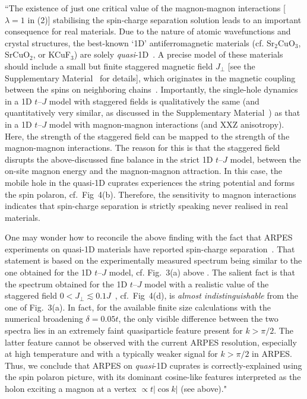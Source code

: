 \documentclass[%
 manuscript,
 amsmath,amssymb,
 aps, onecolumn,
prl,
]{revtex4-1}
\begin{document}
``The existence of just one critical value of the magnon-magnon interactions [$\lambda =1$ in (2)] stabilising the spin-charge separation solution leads to an important consequence for real materials. Due to the nature of atomic wavefunctions and crystal structures, the best-known `1D'
antiferromagnetic materials (cf. Sr$_2$CuO$_3$, SrCuO$_2$, or KCuF$_3$) are solely {\it quasi}-1D~\cite{Kojima1997, Matsuda1997, Lake2005}. A precise model of these materials should include a small but finite staggered magnetic field $J_\perp$ [see the Supplementary Material~\cite{SM} for details], which originates in the magnetic coupling between the spins on neighboring chains~\cite{Schulz1996, Essler1997, Sandvik1999}.
Importantly, the single-hole dynamics in a 1D $t$--$J$ model with staggered fields is qualitatively the same (and quantitatively very similar, as discussed in the Supplementary Material~\cite{SM}) as
that in a 1D $t$--$J$ model with magnon-magnon interactions (and XXZ anisotropy). Here, the strength of the staggered field can be mapped to the strength of the magnon-magnon interactions.
The reason for this is that the staggered field disrupts the above-discussed fine balance in the strict 1D $t$--$J$ model, between the on-site magnon energy and the magnon-magnon attraction. 
In this case, the mobile hole in the quasi-1D cuprates experiences the string potential and forms 
the spin polaron, cf.~Fig~4(b). Therefore, the sensitivity to magnon interactions indicates that spin-charge separation is strictly speaking never realised in real materials.

One may wonder how to reconcile the above finding with the fact that ARPES experiments on quasi-1D materials have reported 
spin-charge separation~\cite{Kim96, Kim1997, Fujisawa1999, Koitzsch2006, Kim06}. That statement is based on the experimentally measured spectrum being similar 
to the one obtained for the 1D $t$--$J$ model, 
cf. Fig.~3(a) above \cite{Kim96, Kim1997, Fujisawa1999, Koitzsch2006, Kim06}. The salient fact is that the spectrum obtained for the 1D $t$--$J$
model with a realistic value of the staggered field $0<J_\perp \lesssim 0.1J$~\cite{SM}, cf.~Fig~4(d), is {\it almost indistinguishable}
from the one of Fig.~3(a). 
In fact, for the available finite size calculations with the numerical broadening $\delta = 0.05 t$, 
the only visible difference between the two spectra lies in an extremely faint quasiparticle feature present for $k>\pi/2$. The latter
feature cannot be observed with the current ARPES resolution, especially at high temperature and with a typically
weaker signal for $k>\pi/2$ in ARPES. Thus, we conclude that ARPES on {\it quasi}-1D
cuprates is correctly-explained using the spin polaron picture, with its dominant cosine-like features interpreted
as the holon exciting a magnon at a vertex $\propto t |\cos k|$ (see above)."
\end{document}
